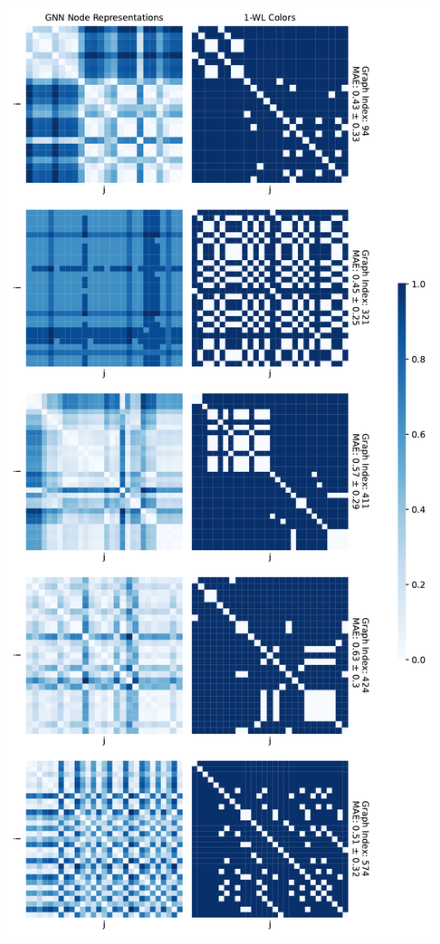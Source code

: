 \begin{figure}[!ht]
\begin{minipage}[b]{0.45992852703\textwidth}
    \end{minipage}
    \hfill
    \begin{minipage}[b]{0.53007147296\textwidth}
        \includegraphics[width=\textwidth, right]{Figures/heatmaps_ENZYMES_1.pdf}

\end{minipage}
\end{figure}

